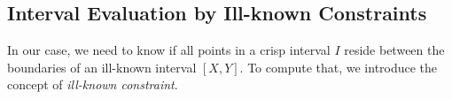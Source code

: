 % 
% 
% 

%  



\subsection{\label{subsec:interval-evaluation-by-ill-known-constraints}Interval Evaluation by Ill-known Constraints}
In our case, we need to know if all points in a crisp interval $I$ reside between the boundaries of an ill-known interval $\left[ X , Y \right]$. To compute that, we introduce the concept of \emph{ill-known constraint}\cite{Pons2011}.




